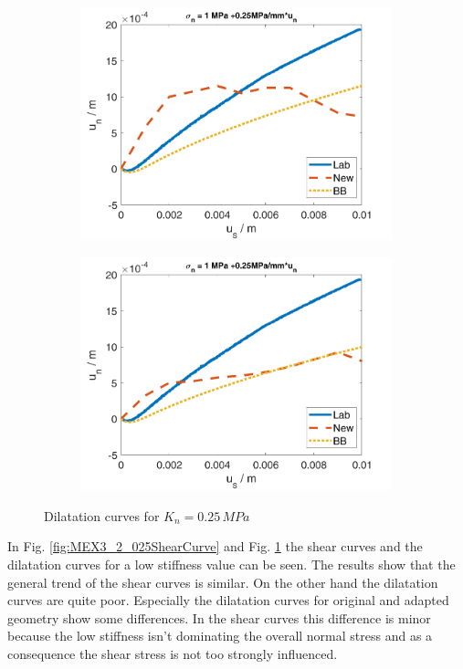 \begin{figure}
\begin{subfigure}[c]{0.48\textwidth}
\includegraphics[width=0.99\textwidth]{./figures/MEX3-2_025DilationOrig.png}
\end{subfigure}
\begin{subfigure}[c]{0.48\textwidth}
\includegraphics[width=0.99\textwidth]{./figures/MEX3-2_025DilationWithout.png}
\end{subfigure}
\caption{Dilatation curves for $K_n=0.25\,\unit{MPa}$}
\label{fig:MEX3-2_025Dilation}
\end{figure}

In Fig. \ref{fig:MEX3_2_025ShearCurve} and Fig. \ref{fig:MEX3-2_025Dilation} the shear curves and the dilatation curves for a low stiffness value can be seen. The results show that the general trend of the shear curves is similar. On the other hand the dilatation curves are quite poor. Especially the dilatation curves for original and adapted geometry show some differences. In the shear curves this difference is minor because the low stiffness isn't dominating the overall normal stress and as a consequence the shear stress is not too strongly influenced.\\

